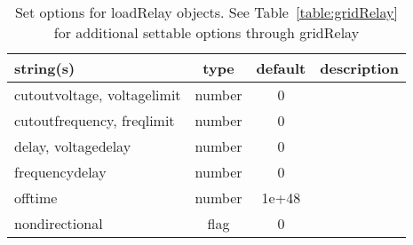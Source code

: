 \begin{table}[ht]
\centering
\begin{tabular}{p{5cm} c c p{7cm}}
\hline
string(s) & type & default & description \\
\hline
cutoutvoltage, voltagelimit & number & 0 & \\
cutoutfrequency, freqlimit & number & 0 & \\
delay, voltagedelay & number & 0 & \\
frequencydelay & number & 0 & \\
offtime & number & 1e+48 & \\
nondirectional & flag & 0 & \\
\hline
\end{tabular}
\caption{Set options for loadRelay objects. See Table~\ref{table:gridRelay} for additional settable options through gridRelay}
\label{table:loadRelay}
\end{table}

